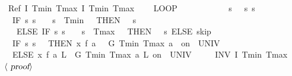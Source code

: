 \documentclass[envcountsame]{llncs}
\begin{document}
\begin{example}
\begin{isabellebody}
\ \ \ {\isachardoublequoteopen}Ref\ {\isasymlceil}I\ Tmin\ Tmax{\isasymrceil}\ {\isasymlceil}I\ Tmin\ Tmax{\isasymrceil}\ {\isasymge}\ \isanewline
\ \ {\isacharparenleft}LOOP\ {\isacharparenleft}\isanewline
\ \ \ \ %
\isanewline
\ \ \ \ {\isacharparenleft}{}\ {\isacharcolon}{\isacharcolon}{\isacharequal}\ {\isacharparenleft}{\isasymlambda}s{\isachardot}\ {}{\isacharparenright}{\isacharparenright}{\isacharsemicolon}{\isacharparenleft}{}\ {\isacharcolon}{\isacharcolon}{\isacharequal}\ {\isacharparenleft}{\isasymlambda}s{\isachardot}\ s{\isachardollar}{}{\isacharparenright}{\isacharparenright}{\isacharsemicolon}\isanewline
\ \ \ \ {\isacharparenleft}IF\ {\isacharparenleft}{\isasymlambda}s{\isachardot}\ s{\isachardollar}{}\ {\isacharequal}\ {}\ {\isasymand}\ s{\isachardollar}{}\ {\isasymle}\ Tmin\ {\isacharplus}\ {}{\isacharparenright}\ THEN\ {\isacharparenleft}{}\ {\isacharcolon}{\isacharcolon}{\isacharequal}\ {\isacharparenleft}{\isasymlambda}s{\isachardot}{}{\isacharparenright}{\isacharparenright}\ \isanewline
\ \ \ \ \ ELSE\ IF\ {\isacharparenleft}{\isasymlambda}s{\isachardot}\ s{\isachardollar}{}\ {\isacharequal}\ {}\ {\isasymand}\ s{\isachardollar}{}\ {\isasymge}\ Tmax\ {\isacharminus}\ {}{\isacharparenright}\ THEN\ {\isacharparenleft}{}\ {\isacharcolon}{\isacharcolon}{\isacharequal}\ {\isacharparenleft}{\isasymlambda}s{\isachardot}{}{\isacharparenright}{\isacharparenright}\ ELSE\ skip{\isacharparenright}{\isacharsemicolon}\isanewline
\ \ \ \ %
\isanewline
\ \ \ \ {\isacharparenleft}IF\ {\isacharparenleft}{\isasymlambda}s{\isachardot}\ s{\isachardollar}{}\ {\isacharequal}\ {}{\isacharparenright}\ THEN\ {\isacharparenleft}x{\isasymacute}{\isacharequal}\ f\ a\ {}\ {\isacharampersand}\ G\ Tmin\ Tmax\ a\ {}\ on\ {\isacharbraceleft}{}{\isachardot}{\isachardot}{\isasymtau}{\isacharbraceright}\ UNIV\ {\isacharat}\ {}{\isacharparenright}\ \isanewline
\ \ \ \ ELSE\ {\isacharparenleft}x{\isasymacute}{\isacharequal}\ f\ a\ L\ {\isacharampersand}\ G\ Tmin\ Tmax\ a\ L\ on\ {\isacharbraceleft}{}{\isachardot}{\isachardot}{\isasymtau}{\isacharbraceright}\ UNIV\ {\isacharat}\ {}{\isacharparenright}{\isacharparenright}\isanewline
\ \ {\isacharparenright}\ INV\ I\ Tmin\ Tmax{\isacharparenright}{\isachardoublequoteclose}\isanewline
\ \ $\langle \isa{proof}\rangle$\isanewline
\end{isabellebody}
\end{example}
\end{document}
